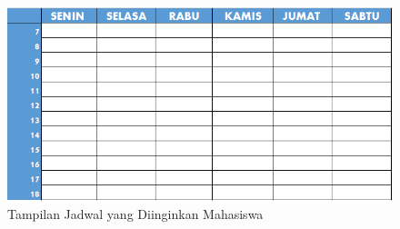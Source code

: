 \begin{enumerate}
		\begin{figure}[H]
			\centering
			\includegraphics[scale=0.5]{Gambar/jadwal-rekap}
			\caption{Tampilan Jadwal yang Diinginkan Mahasiswa} 
			\label{fig:3_jadwal_rekap}
		\end{figure}
		

\end{enumerate}

